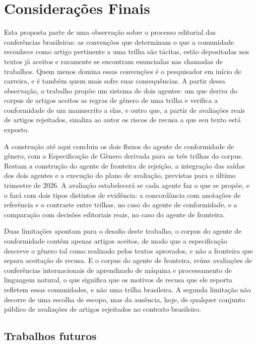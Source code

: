 \chapter{Considerações Finais}\label{chap:consideracoes_finais}

Esta proposta parte de uma observação sobre o processo editorial das conferências brasileiras: as convenções que determinam o que a comunidade reconhece como artigo pertinente a uma trilha são tácitas, estão depositadas nos textos já aceitos e raramente se encontram enunciadas nas chamadas de trabalhos. Quem menos domina essas convenções é o pesquisador em início de carreira, e é também quem mais sofre suas consequências. A partir dessa observação, o trabalho propõe um sistema de dois agentes: um que deriva do corpus de artigos aceitos as regras de gênero de uma trilha e verifica a conformidade de um manuscrito a elas, e outro que, a partir de avaliações reais de artigos rejeitados, sinaliza ao autor os riscos de recusa a que seu texto está exposto.

A construção até aqui concluiu os dois fluxos do agente de conformidade de gênero, com a Especificação de Gênero derivada para as três trilhas do corpus. Restam a construção do agente de fronteira de rejeição, a integração das saídas dos dois agentes e a execução do plano de avaliação, previstas para o último trimestre de 2026. A avaliação estabelecerá se cada agente faz o que se propõe, e o fará com dois tipos distintos de evidência: a concordância com anotações de referência e o contraste entre trilhas, no caso do agente de conformidade, e a comparação com decisões editoriais reais, no caso do agente de fronteira.

Duas limitações apontam para o desafio deste trabalho, o corpus do agente de conformidade contém apenas artigos aceitos, de modo que a especificação descreve o gênero tal como realizado pelos textos aprovados, e não a fronteira que separa aceitação de recusa. E o corpus do agente de fronteira, reúne avaliações de conferências internacionais de aprendizado de máquina e processamento de linguagem natural, o que significa que os motivos de recusa que ele reporta refletem essas comunidades, e não uma trilha brasileira. A segunda limitação não decorre de uma escolha de escopo, mas da ausência, hoje, de qualquer conjunto público de avaliações de artigos rejeitados no contexto brasileiro.


\section{Trabalhos futuros}
\label{sec:trabalhos-futuros}

